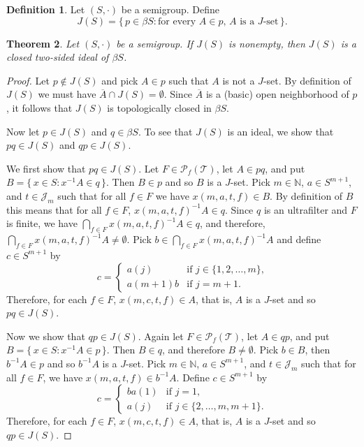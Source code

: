 \documentclass[12pt,showtrims]{memoir}
\theoremstyle{plain}
\newtheorem{thm}{Theorem}[section]
\theoremstyle{definition}
\newtheorem{defn}[thm]{Definition}
\newcommand{\bbN}{\mathbb{N}}
\newcommand{\calJ}{\mathcal{J}}
\newcommand{\calT}{\mathcal{T}}
\newcommand{\Pf}{\mathcal{P}_f}
\begin{document}
\begin{defn}
  Let $(S, \cdot)$ be a semigroup. 
  Define
  \[
    J(S) = \{\, p \in \beta S : \mbox{for every $A \in p$, $A$ is a $J$-set} \,\}.
  \]
\end{defn}

\begin{thm}
  Let $(S, \cdot)$ be a semigroup.
  If $J(S)$ is nonempty, then $J(S)$ is a closed two-sided ideal of $\beta S$.
\end{thm}
\begin{proof}
  Let $p \not\in J(S)$ and pick $A \in p$ such that $A$ is not a $J$-set.
  By definition of $J(S)$ we must have $\overline{A} \cap J(S) = \emptyset$.
  Since $\overline{A}$ is a (basic) open neighborhood of $p$, it follows that $J(S)$ is topologically closed in $\beta S$.

  Now let $p \in J(S)$ and $q \in \beta S$.
  To see that $J(S)$ is an ideal, we show that $pq \in J(S)$ and $qp \in J(S)$. 

  We first show that $pq \in J(S)$.
  Let $F \in \Pf(\calT)$, let $A \in pq$, and put $B = \{\, x \in S : x^{-1}A \in q \,\}$.
  Then $B \in p$ and so $B$ is a $J$-set.
  Pick $m \in \bbN$, $a \in S^{m+1}$, and $t \in \calJ_m$ such that for all $f \in F$ we have $x(m, a, t, f) \in B$.
  By definition of $B$ this means that for all $f \in F$, $x(m, a, t, f)^{-1}A \in q$. 
  Since $q$ is an ultrafilter and $F$ is finite, we have $\bigcap_{f \in F} x(m, a, t, f)^{-1}A \in q$, and therefore, $\bigcap_{f \in F} x(m, a, t, f)^{-1}A \ne \emptyset$.
  Pick $b \in \bigcap_{f \in F} x(m, a, t, f)^{-1}A$ and define $c \in S^{m+1}$ by
  \[
    c =
    \begin{cases}
      a(j) & \mbox{if $j \in \{1, 2, \ldots, m\}$,} \\
      a(m+1)b & \mbox{if $j = m+1$.}
    \end{cases}
  \]
  Therefore, for each $f \in F$, $x(m, c, t, f) \in A$, that is, $A$ is a $J$-set and so $pq \in J(S)$.

  Now we show that $qp \in J(S)$.
  Again let $F \in \Pf(\calT)$, let $A \in qp$, and put $B = \{\, x \in S : x^{-1}A \in p \,\}$.
  Then $B \in q$, and therefore $B \ne \emptyset$.
  Pick $b \in B$, then $b^{-1}A \in p$ and so $b^{-1}A$ is a $J$-set.
  Pick $m \in \bbN$, $a \in S^{m+1}$, and $t \in \calJ_m$ such that for all $f \in F$, we have $x(m, a, t, f) \in b^{-1}A$.
  Define $c \in S^{m+1}$ by
  \[
    c =
    \begin{cases}
      ba(1) & \mbox{if $j =1$,} \\
      a(j) & \mbox{if $j \in \{2, \ldots, m, m+1\}$.}
    \end{cases}
  \]
  Therefore, for each $f \in F$, $x(m, c, t, f) \in A$, that is, $A$ is a $J$-set and so $qp \in J(S)$.
\end{proof}
\end{document}
